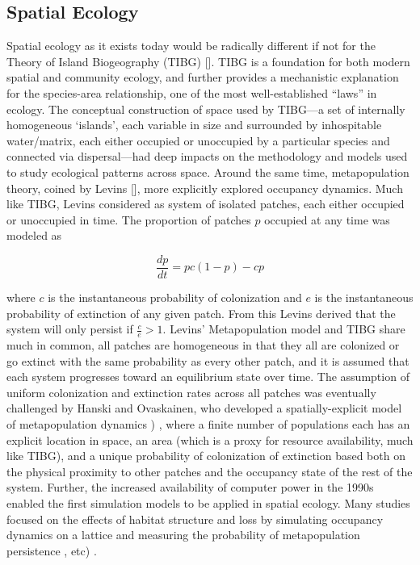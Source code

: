 \documentclass[]{article}
\begin{document}
\hypertarget{spatial-ecology}{%
\subsection{Spatial Ecology}\label{spatial-ecology}}

Spatial ecology as it exists today would be radically different if not
for the Theory of Island Biogeography (TIBG)
{[}\citep{macarthur_and_wilson}{]}. TIBG is a foundation for both
modern spatial and community ecology, and further provides a mechanistic
explanation for the species-area relationship, one of the most
well-established ``laws'' in ecology. The conceptual construction of
space used by TIBG---a set of internally homogeneous `islands', each
variable in size and surrounded by inhospitable water/matrix, each
either occupied or unoccupied by a particular species and connected via
dispersal---had deep impacts on the methodology and models used to study
ecological patterns across space. Around the same time, metapopulation
theory, coined by Levins {[}\citep{levins_metapop}{]}, more
explicitly explored occupancy dynamics. Much like TIBG, Levins
considered as system of isolated patches, each either occupied or
unoccupied in time. The proportion of patches \(p\) occupied at any time
was modeled as

\[\frac{dp}{dt} = pc(1-p) - cp\]

where \(c\) is the instantaneous probability of colonization and \(e\)
is the instantaneous probability of extinction of any given patch. From
this Levins derived that the system will only persist if
\(\frac{c}{e} > 1\). Levins' Metapopulation model and TIBG share much in
common, all patches are homogeneous in that they all are colonized or go
extinct with the same probability as every other patch, and it is
assumed that each system progresses toward an equilibrium state over
time. The assumption of uniform colonization and extinction rates across
all patches was eventually challenged by Hanski and Ovaskainen, who
developed a spatially-explicit model of metapopulation dynamics
\citep{hanski_1994}) , where a finite number of populations each has
an explicit location in space, an area (which is a proxy for resource
availability, much like TIBG), and a unique probability of colonization
of extinction based both on the physical proximity to other patches and
the occupancy state of the rest of the system. Further, the increased
availability of computer power in the 1990s enabled the first simulation
models to be applied in spatial ecology. Many studies focused on the
effects of habitat structure and loss by simulating occupancy dynamics
on a lattice and measuring the probability of metapopulation persistence
\citep{bascompte}, etc) .
\end{document}
